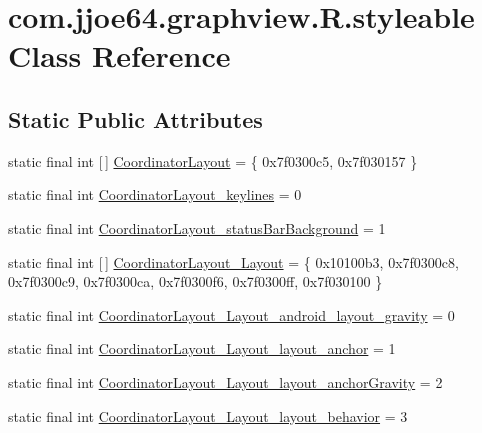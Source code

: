 \hypertarget{classcom_1_1jjoe64_1_1graphview_1_1_r_1_1styleable}{}\section{com.\+jjoe64.\+graphview.\+R.\+styleable Class Reference}
\label{classcom_1_1jjoe64_1_1graphview_1_1_r_1_1styleable}
\subsection*{Static Public Attributes}
\begin{DoxyCompactItemize}
\item 
static final int \mbox{[}$\,$\mbox{]} \mbox{\hyperlink{classcom_1_1jjoe64_1_1graphview_1_1_r_1_1styleable_af683975ef36a8c7a39aba1617a3dabfc}{Coordinator\+Layout}} = \{ 0x7f0300c5, 0x7f030157 \}
\item 
static final int \mbox{\hyperlink{classcom_1_1jjoe64_1_1graphview_1_1_r_1_1styleable_a741a80a20a1bde314f6c3f4bbe97d94b}{Coordinator\+Layout\+\_\+keylines}} = 0
\item 
static final int \mbox{\hyperlink{classcom_1_1jjoe64_1_1graphview_1_1_r_1_1styleable_affc04214b08f7d5707d074f67d9696cd}{Coordinator\+Layout\+\_\+status\+Bar\+Background}} = 1
\item 
static final int \mbox{[}$\,$\mbox{]} \mbox{\hyperlink{classcom_1_1jjoe64_1_1graphview_1_1_r_1_1styleable_a10d9fc725636b9fc682f9fba52e9d9f8}{Coordinator\+Layout\+\_\+\+Layout}} = \{ 0x10100b3, 0x7f0300c8, 0x7f0300c9, 0x7f0300ca, 0x7f0300f6, 0x7f0300ff, 0x7f030100 \}
\item 
static final int \mbox{\hyperlink{classcom_1_1jjoe64_1_1graphview_1_1_r_1_1styleable_a1491af5cec885f37e61af6bc32938571}{Coordinator\+Layout\+\_\+\+Layout\+\_\+android\+\_\+layout\+\_\+gravity}} = 0
\item 
static final int \mbox{\hyperlink{classcom_1_1jjoe64_1_1graphview_1_1_r_1_1styleable_ae41774814ef64e75325a40b0af00251f}{Coordinator\+Layout\+\_\+\+Layout\+\_\+layout\+\_\+anchor}} = 1
\item 
static final int \mbox{\hyperlink{classcom_1_1jjoe64_1_1graphview_1_1_r_1_1styleable_af2bdec432f49a75d0d786db90771a1c7}{Coordinator\+Layout\+\_\+\+Layout\+\_\+layout\+\_\+anchor\+Gravity}} = 2
\item 
static final int \mbox{\hyperlink{classcom_1_1jjoe64_1_1graphview_1_1_r_1_1styleable_a4c054c3f1aaea807937bb3aadb1937ba}{Coordinator\+Layout\+\_\+\+Layout\+\_\+layout\+\_\+behavior}} = 3

\end{DoxyCompactItemize}
